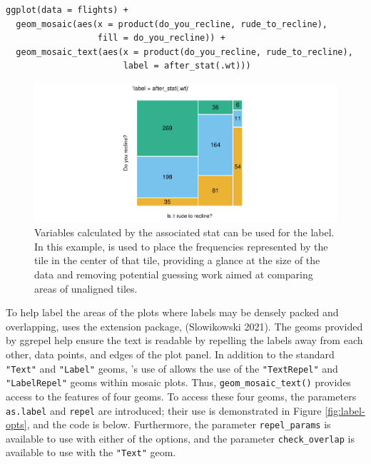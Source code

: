 \begin{verbatim}
ggplot(data = flights) +
  geom_mosaic(aes(x = product(do_you_recline, rude_to_recline), 
                  fill = do_you_recline)) +
  geom_mosaic_text(aes(x = product(do_you_recline, rude_to_recline), 
                       label = after_stat(.wt)))
\end{verbatim}

\begin{figure}

{\centering \includegraphics[width=1\linewidth]{RJ-2023-013_files/figure-latex/labels2-1} 

}

\caption{Variables calculated by the associated stat can be used for the label. In this example,  is used to place the frequencies represented by the tile in the center of that tile, providing a glance at the size of the data and removing potential guessing work aimed at comparing areas of unaligned tiles.}\label{fig:labels2}
\end{figure}

To help label the areas of the plots where labels may be densely packed and overlapping,  uses the  extension package,  (Slowikowski 2021). The geoms provided by ggrepel help ensure the text is readable by repelling the labels away from each other, data points, and edges of the plot panel. In addition to the standard \texttt{"Text"} and \texttt{"Label"} geoms, 's use of  allows the use of the \texttt{"TextRepel"} and \texttt{"LabelRepel"} geoms within mosaic plots. Thus, \texttt{geom\_mosaic\_text()} provides access to the features of four geoms. To access these four geoms, the parameters \texttt{as.label} and \texttt{repel} are introduced; their use is demonstrated in Figure \ref{fig:label-opts}, and the code is below. Furthermore, the parameter \texttt{repel\_params} is available to use with either of the  options, and the parameter \texttt{check\_overlap} is available to use with the \texttt{"Text"} geom.

